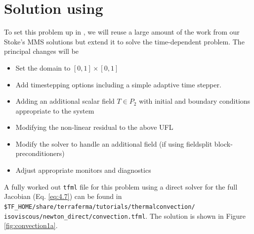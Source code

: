 \section{Solution using \TF}
\label{sec:solution-using-tf}

To set this problem up in \TF{}, we will reuse a large amount of the
work from our Stoke's MMS solutions but extend it to solve the
time-dependent problem.  The principal changes will be
\begin{itemize}
\setlength{\itemsep}{-.1em}
\item Set the domain to  $[0,1]\times[0,1]$ 
\item Add timestepping options including a simple adaptive time stepper.
\item Adding an additional scalar field $T\in P_{2}$ with initial and
  boundary conditions appropriate  to the system
\item Modifying the non-linear residual to the above UFL
\item Modify the solver to handle an additional field (if using
  fieldsplit block-preconditioners)
\item Adjust appropriate monitors and diagnostics
\end{itemize}

A fully worked out \texttt{tfml} file for this problem using a direct
solver for the full Jacobian (Eq. \ref{eq:4.7}) %
can be found in
\texttt{\$TF\_HOME/share/terraferma/tutorials/thermalconvection/ isoviscous/newton\_direct/convection.tfml}.  The
solution is shown in Figure \ref{fig:convection1a}.   





